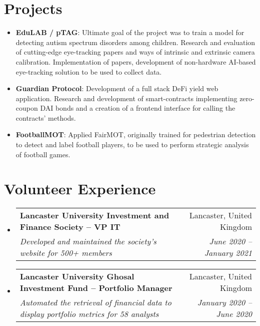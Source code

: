\documentclass[a4paper]{article}
\makeatletter
\newcommand{\resumeItem}[2]{
  \item\small{
    \textbf{#1}{: #2 \vspace{-2pt}}
  }
}
\newcommand{\resumeSubheading}[4]{
  \vspace{-1pt}\item
    \begin{tabular*}{0.97\textwidth}{l@{\extracolsep{\fill}}r}
      \textbf{#1} & #2 \\
      \textit{#3} & \textit{#4} \\
    \end{tabular*}\vspace{-5pt}
}
\newcommand{\resumeSubItem}[2]{\resumeItem{#1}{#2}\vspace{-3pt}}
\newcommand{\resumeSubHeadingListStart}{\begin{itemize}[leftmargin=*]}
\newcommand{\resumeSubHeadingListEnd}{\end{itemize}}
\makeatother
\begin{document}
\section{Projects}
\resumeSubHeadingListStart
\resumeSubItem{EduLAB / pTAG}{Ultimate goal of the project was to train a model for detecting autism spectrum disorders among children. Research and evaluation of cutting-edge eye-tracking papers and ways of intrinsic and extrinsic camera calibration. Implementation of papers, development of non-hardware AI-based eye-tracking solution to be used to collect data.}
\vspace{2pt}
\resumeSubItem{Guardian Protocol}{Development of a full stack DeFi yield web application. Research and development of smart-contracts implementing zero-coupon DAI bonds and a creation of a frontend interface for calling the contracts’ methods.}
\resumeSubItem{FootballMOT}{Applied FairMOT, originally trained for pedestrian detection to detect and label football players, to be used to perform strategic analysis of football games.}
\resumeSubHeadingListEnd

\vspace{-5pt}
\section{Volunteer Experience}
  \resumeSubHeadingListStart
    \resumeSubheading
    {Lancaster University Investment and Finance Society – VP IT}{Lancaster, United Kingdom}
    {Developed and maintained the society's website for 500+ members}{June 2020 – January 2021}
\vspace{1pt}
    \resumeSubheading
    {Lancaster University Ghosal Investment Fund – Portfolio Manager}{Lancaster, United Kingdom}
    {Automated the retrieval of financial data to display portfolio metrics for 58 analysts}{January 2020 – June 2020}

\resumeSubHeadingListEnd
\end{document}
